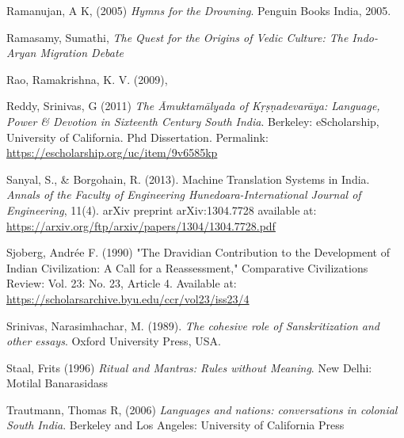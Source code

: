 \begin{thebibliography}{99}
  Ramanujan, A K, (2005) \textit{Hymns for the Drowning}. Penguin Books India, 2005.

  Ramasamy, Sumathi, \textit{The Quest for the Origins of Vedic Culture: The Indo-Aryan Migration Debate}

  Rao, Ramakrishna, K. V. (2009), 

  Reddy, Srinivas, G (2011) \textit{The Āmuktamālyada of Kṛṣṇadevarāya: Language, Power \& Devotion in Sixteenth Century South India}. Berkeley: eScholarship, University of California. Phd Dissertation. Permalink: \url{https://escholarship.org/uc/item/9v6585kp}

  Sanyal, S., \& Borgohain, R. (2013). Machine Translation Systems in India. \textit{Annals of the Faculty of Engineering Hunedoara-International Journal of Engineering}, 11(4). arXiv preprint arXiv:1304.7728 available at: \url{https://arxiv.org/ftp/arxiv/papers/1304/1304.7728.pdf}

  Sjoberg, Andrée F. (1990) "The Dravidian Contribution to the Development of Indian Civilization: A Call for a Reassessment," Comparative Civilizations Review: Vol. 23: No. 23, Article 4. Available at: \url{https://scholarsarchive.byu.edu/ccr/vol23/iss23/4}

  Srinivas, Narasimhachar, M. (1989). \textit{The cohesive role of Sanskritization and other essays}. Oxford University Press, USA.

  Staal, Frits (1996) \textit{Ritual and Mantras: Rules without Meaning}. New Delhi: Motilal Banarasidass

  Trautmann, Thomas R, (2006) \textit{Languages and nations: conversations in colonial South India}. Berkeley and Los Angeles: University of California Press

 \end{thebibliography}

